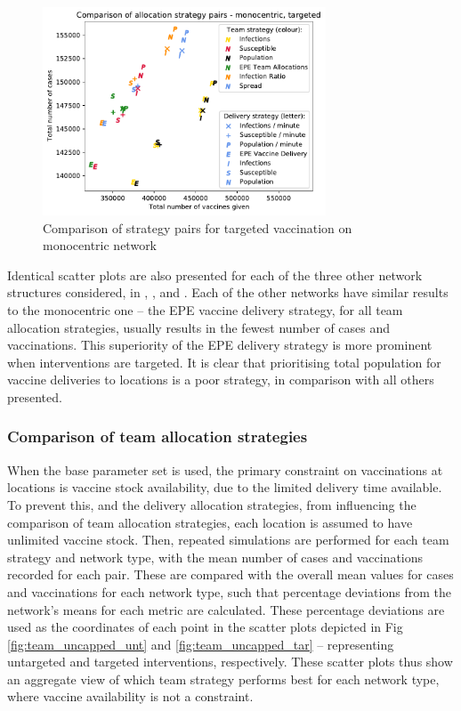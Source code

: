 \documentclass[10pt,letterpaper]{article}
\begin{document}
\begin{figure}[ht!]{\textwidth}
\begin{center}
    \includegraphics[width=0.75\textwidth]{figures/strategies/team_vaccine_scatter_targeted_monocentric.pdf}
    \caption{Comparison of strategy pairs for targeted vaccination on monocentric network} 
    \label{fig:strat_scatter_tar_mono}
\end{center}
\end{figure}

Identical scatter plots are also presented for each of the three other network structures considered, in , , and . Each of the other networks have similar results to the monocentric one -- the EPE vaccine delivery strategy, for all team allocation strategies, usually results in the fewest number of cases and vaccinations. This superiority of the EPE delivery strategy is more prominent when interventions are targeted. It is clear that prioritising total population for vaccine deliveries to locations is a poor strategy, in comparison with all others presented.

\subsubsection*{Comparison of team allocation strategies}
When the base parameter set is used, the primary constraint on vaccinations at locations is vaccine stock availability, due to the limited delivery time available. To prevent this, and the delivery allocation strategies, from influencing the comparison of team allocation strategies, each location is assumed to have unlimited vaccine stock. Then, repeated simulations are performed for each team strategy and network type, with the mean number of cases and vaccinations recorded for each pair. These are compared with the overall mean values for cases and vaccinations for each network type, such that percentage deviations from the network's means for each metric are calculated. These percentage deviations are used as the coordinates of each point in the scatter plots depicted in Fig \ref{fig:team_uncapped_unt} and \ref{fig:team_uncapped_tar} -- representing untargeted and targeted interventions, respectively. These scatter plots thus show an aggregate view of which team strategy performs best for each network type, where vaccine availability is not a constraint.
\end{document}
